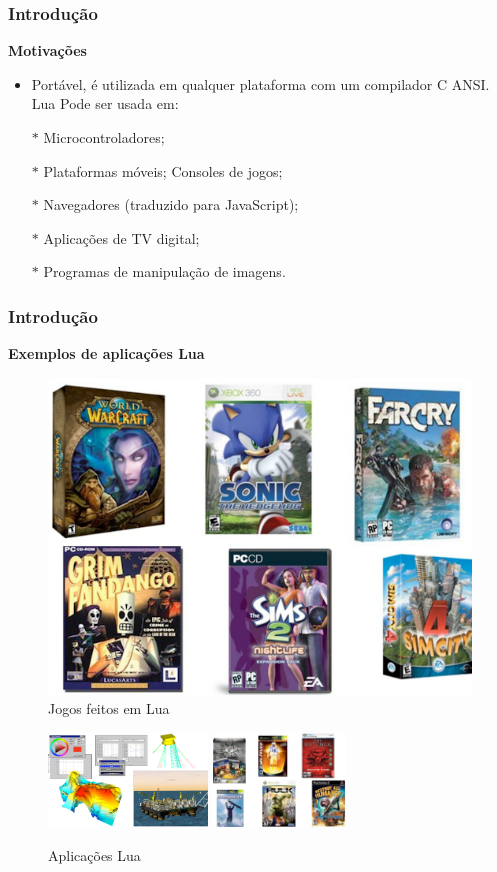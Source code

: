 \documentclass{beamer}
\begin{document}
\begin{frame}[fragile]
	\frametitle{Introdução}
	{\bf Motivações}\vspace{0.4cm}
	\begin{itemize}
		\item Portável, é utilizada em qualquer plataforma com um compilador C ANSI. Lua Pode ser usada em:
		\pause
		\item [$\mathbb{*}$] Microcontroladores; 
		\item [$\mathbb{*}$] Plataformas móveis;
		Consoles de jogos;
		\item [$\mathbb{*}$] Navegadores (traduzido para JavaScript);
		\item [$\mathbb{*}$] Aplicações de TV digital;
		\item [$\mathbb{*}$] Programas de manipulação de imagens.
	\end{itemize}
\end{frame}

\begin{frame}[fragile]
	\frametitle{Introdução}
	{\bf Exemplos de aplicações Lua}\vspace{0.4cm}
		\begin{figure}[H]
		\centering
		\includegraphics[width=0.4\linewidth]{imagens/exemplo2}
		\caption{Jogos feitos em Lua}
		\end{figure}

		\begin{figure}[H]
			\centering
			\includegraphics[height=2.5cm]{imagens/exemplo3}
			\label{figdroopy}
			\quad %
			\includegraphics[height=2.5cm]{imagens/exemplo1}
			\label{figsnoop}
			\caption{Aplicações Lua}
			\label{fig01}
		\end{figure}
\end{frame}
\end{document}
